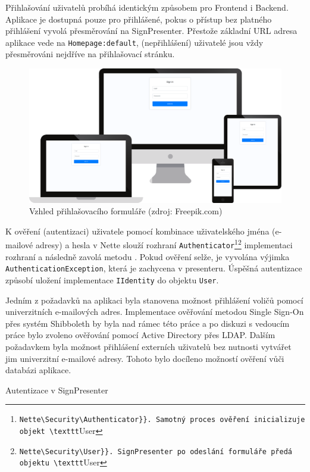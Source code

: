 Přihlašování uživatelů probíhá identickým způsobem pro Frontend i Backend. Aplikace je dostupná pouze pro přihlášené, pokus o přístup bez platného přihlášení vyvolá přesměrování na SignPresenter. Přestože základní URL adresa aplikace vede na \texttt{Homepage:default}, (nepřihlášení) uživatelé jsou vždy přesměrováni nejdříve na přihlašovací stránku.

\begin{figure}[h]
	\centering
	\includegraphics[width=\linewidth]{svg/mockup/prihlasovani.eps}
	\captionsetup{width=\linewidth}
	\caption[Vzhled přihlašovacího formuláře]{Vzhled přihlašovacího formuláře (zdroj: Freepik.com)}
	\label{mockup:login}
\end{figure}

K ověření (autentizaci) uživatele pomocí kombinace uživatelského jména (e-mailové adresy) a hesla v Nette slouží rozhraní \texttt{Authenticator}\footnote{\Verb{Nette\Security\Authenticator}}. Samotný proces ověření inicializuje objekt \texttt{User}\footnote{\label{user}\Verb{Nette\Security\User}}. SignPresenter po odeslání formuláře předá objektu \texttt{User} implementaci rozhraní a následně zavolá metodu . Pokud ověření selže, je vyvolána výjimka \texttt{AuthenticationException}, která je zachycena v presenteru. Úspěšná autentizace způsobí uložení implementace \texttt{IIdentity} do objektu \texttt{User}.

Jedním z požadavků na aplikaci byla stanovena možnost přihlášení voličů pomocí univerzitních e-mailových adres. Implementace ověřování metodou Single Sign-On přes systém Shibboleth by byla nad rámec této práce a po diskuzi s vedoucím práce bylo zvoleno ověřování pomocí Active Directory přes LDAP. Dalším požadavkem byla možnost přihlášení externích uživatelů bez nutnosti vytvářet jim univerzitní e-mailové adresy. Tohoto bylo docíleno možností ověření vůči databázi aplikace.
\clearpage
\begin{listing}[ht]
\caption{Autentizace v SignPresenter}
\label{php:autentizace}
\end{listing}

